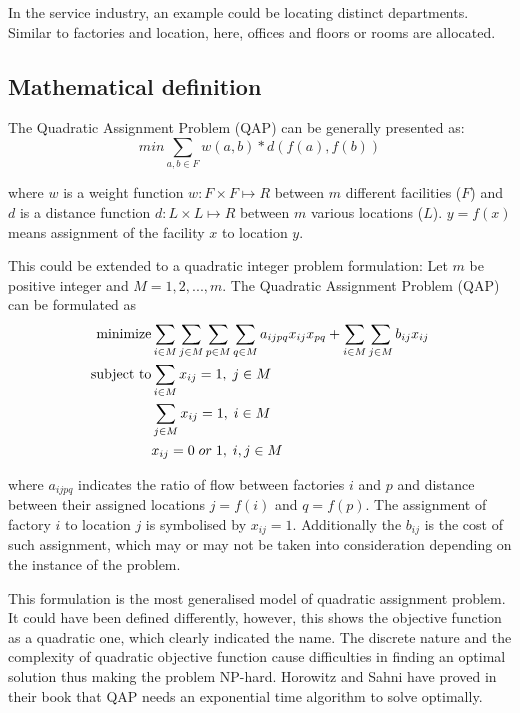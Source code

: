 \documentclass[english,a4paper,twoside]{ppfcmthesis}
\begin{document}
In the service industry, an example could be locating distinct departments.
Similar to factories and location, here, offices and floors or rooms are allocated.

\subsection{Mathematical definition}
The Quadratic Assignment Problem (QAP) can be generally presented as:
\begin{equation}
min \sum_{a, b \in F} w(a, b) * d( f(a), f(b))
\end{equation}

where $w$ is a weight function $w: F \times F \mapsto R$ between $m$ different facilities ($F$) and $d$ is a distance function $d: L \times L \mapsto R$ between $m$ various locations ($L$). $y = f(x)$ means assignment of the facility $x$ to location $y$.

This could be extended to a quadratic integer problem formulation:
Let $m$ be positive integer and $M = { 1, 2, ..., m }$. The Quadratic Assignment Problem (QAP) can be formulated as
\begin{align}
  \text{minimize} &\null \sum_{i \in M} \sum_{j \in M} \sum_{p \in M} \sum_{q \in M} a_{ijpq}x_{ij}x_{pq} + \sum_{i \in M} \sum_{j \in M} b_{ij} x_{ij} \\
  \text{subject to} &\null \sum_{i \in M} x_{ij} = 1, \; j \in M \\
  &\null \sum_{j \in M} x_{ij} = 1, \; i \in M \\
  &\null x_{ij} = 0 \; or \; 1, \; i, j \in M
\end{align}

where $a_{ijpq}$ indicates the ratio of flow between factories $i$ and $p$ and distance between their assigned locations $j = f(i)$ and $q = f(p)$.
The assignment of factory $i$ to location $j$ is symbolised by $x_{ij} = 1$.
Additionally the $b_{ij}$ is the cost of such assignment, which may or may not be taken into consideration depending on the instance of the problem.

This formulation is the most generalised model of quadratic assignment problem.
It could have been defined differently, however, this shows the objective function as a quadratic one, which clearly indicated the name.
The discrete nature and the complexity of quadratic objective function cause difficulties in finding an optimal solution thus making the problem NP-hard.
Horowitz and Sahni have proved in their book \cite{horowitz1978fundamentals} that QAP needs an exponential time algorithm to solve optimally.
\end{document}
